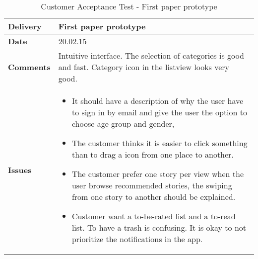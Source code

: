 \renewcommand{\arraystretch}{2}%
\begin{center}
	\begin{longtable}{ | p{4cm} | p{13cm} | }
		
		\caption[Customer Acceptance test]{Customer Acceptance Test - First paper prototype } \label{Tab:cattest1}\\
		\hline
		\textbf{Delivery} & First paper prototype\\ \hline
		\textbf{Date} & 20.02.15 \\ \hline 
		\textbf{Comments} &Intuitive interface. The selection of categories is good and fast. Category icon in the listview looks very good.
		\\ \hline
		\textbf{Issues} &	
		\begin{itemize}
			\item It should have a description of why the user have to sign in by email and give the user the option to choose age group and gender,
			\item The customer thinks it is easier to click something than to drag a icon from one place to another. 
			\item The customer prefer one story per view when the user browse recommended stories, the swiping from one story to another should be explained. 
			\item Customer want a to-be-rated list and a to-read list. To have a trash is confusing. It is okay to not prioritize the notifications in the app. 
		\end{itemize}	
		\\ \hline
		
	\end{longtable}
\end{center}

